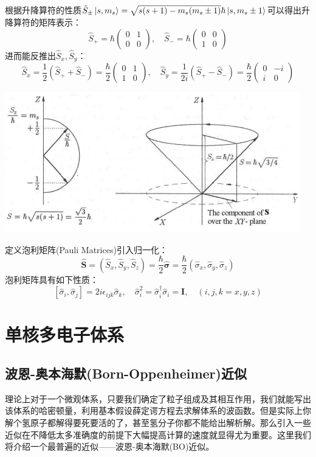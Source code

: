 根据升降算符的性质$\hat{S}_{\pm}\ket{s,m_s}=\sqrt{s(s+1)-m_s(m_s\pm1)}\hbar\ket{s,m_s\pm1}$可以得出升降算符的矩阵表示：
\[\hat{S}_+=\hbar\begin{pmatrix} 0 & 1 \\ 0 & 0 \end{pmatrix}, \quad \hat{S}_-=\hbar\begin{pmatrix} 0 & 0\\ 1 & 0 \end{pmatrix}\]
进而能反推出$\hat{S}_x,\hat{S}_y$：
\[\hat{S}_x=\frac{1}{2}(\hat{S}_++\hat{S}_-)=\frac{\hbar}{2}\begin{pmatrix} 0 & 1 \\ 1 & 0 \end{pmatrix}, \quad \hat{S}_y=\frac{1}{2i}(\hat{S}_+-\hat{S}_-)=\frac{\hbar}{2}\begin{pmatrix} 0 & -i \\ i & 0 \end{pmatrix}\]

\begin{center}
    \includegraphics[scale=0.7]{fig/lzhx/微信图片_20211028113518}
\end{center}

定义泡利矩阵(Pauli Matrices)引入归一化：
\[\hat{\bm{S}}=(\hat{S}_x,\hat{S}_y,\hat{S}_z)=\frac{\hbar}{2}\hat{\bm{\sigma}}=\frac{\hbar}{2}(\hat{\sigma}_x,\hat{\sigma}_y,\hat{\sigma}_z)\]
泡利矩阵具有如下性质：
\[[\hat{\sigma}_i,\hat{\sigma}_j]=2i\epsilon_{ijk}\hat{\sigma}_k, \quad \hat{\sigma}_i^2=\hat{\sigma}_i^{\dagger}\hat{\sigma}_i=\mathbf{I}, \quad (i,j,k=x,y,z)\]



\section{单核多电子体系}
\subsection{波恩-奥本海默(Born-Oppenheimer)近似}
理论上对于一个微观体系，只要我们确定了粒子组成及其相互作用，我们就能写出该体系的哈密顿量，利用基本假设薛定谔方程去求解体系的波函数。但是实际上你解个氢原子都解得要死要活的了，甚至氢分子你都不能给出解析解。那么引入一些近似在不降低太多准确度的前提下大幅提高计算的速度就显得尤为重要。这里我们将介绍一个最普遍的近似——波恩-奥本海默(BO)近似。

